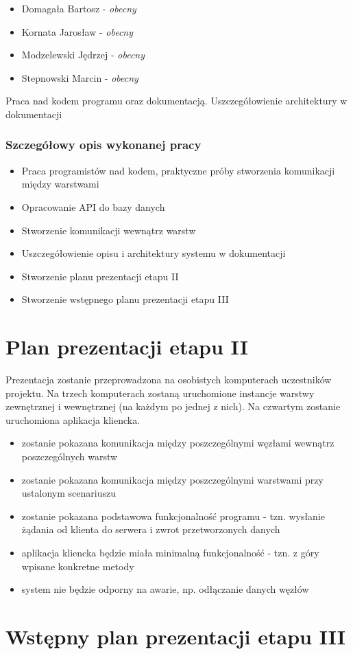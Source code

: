 \begin{itemize}
\item Domagała Bartosz - \textit{obecny}
\item Kornata Jarosław - \textit{obecny}
\item Modzelewski Jędrzej - \textit{obecny}
\item Stepnowski Marcin - \textit{obecny}
\end{itemize}

\par{Praca nad kodem programu oraz dokumentacją. Uszczegółowienie architektury w dokumentacji}

\subsubsection*[Szczegółowy opis wykonanej pracy]{Szczegółowy opis wykonanej pracy}
\begin{itemize}
\item Praca programistów nad kodem, praktyczne próby stworzenia komunikacji między warstwami
\item Opracowanie API do bazy danych
\item Stworzenie komunikacji wewnątrz warstw
\item Uszczegółowienie opisu i architektury systemu w dokumentacji
\item Stworzenie planu prezentacji etapu II
\item Stworzenie wstępnego planu prezentacji etapu III
\end{itemize}

\section[Plan prezentacji etapu II]{Plan prezentacji etapu II}
\par{Prezentacja zostanie przeprowadzona na osobistych komputerach uczestników projektu. Na trzech komputerach zostaną uruchomione instancje warstwy zewnętrznej i wewnętrznej (na każdym po jednej z nich). Na czwartym zostanie uruchomiona aplikacja kliencka.}

\begin{itemize}
\item zostanie pokazana komunikacja między poszczególnymi węzłami wewnątrz poszczególnych warstw
\item zostanie pokazana komunikacja między poszczególnymi warstwami przy ustalonym scenariuszu
\item zostanie pokazana podstawowa funkcjonalność programu - tzn. wysłanie żądania od klienta do serwera i zwrot przetworzonych danych
\item aplikacja kliencka będzie miała minimalną funkcjonalność - tzn. z góry wpisane konkretne metody
\item system nie będzie odporny na awarie, np. odłączanie danych węzłów
\end{itemize}

\section[Wstępny plan prezentacji etapu III]{Wstępny plan prezentacji etapu III}